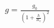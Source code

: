 \documentclass[preview]{standalone}
\begin{document}
\begin{align*}
g = \frac{g_0}{(1 + \frac{h}{R_e})^2}
\end{align*}
\end{document}
